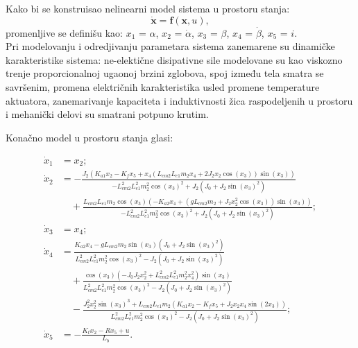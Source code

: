 \documentclass[a4paper,11pt]{article}
\theoremstyle{definition} \newtheorem{deff}{Definicija}[section]
\theoremstyle{definition} \newtheorem{prim}[deff]{Primer}
\theoremstyle{plain} \newtheorem{teor}[deff]{Teorema}
\newcommand{\vect}[1]{\boldsymbol{\mathbf{#1}}}
\begin{document}
	Kako bi se konstruisao nelinearni model sistema u prostoru stanja: 
	\begin{equation}
		\dot{ \vect{x}} = \vect{f}(\vect{x}, u),
	\end{equation}
	promenljive se definišu kao: $x_1$ = $\alpha$, $x_2$ = $\dot\alpha$,  $x_3$ = $\beta$, $x_4$ = $\dot\beta$, $x_5$ = $i$. \\
	
	
	Pri modelovanju i odredjivanju parametara sistema
	zanemarene su dinamičke karakteristike sistema: ne-elektične disipativne sile modelovane su kao viskozno trenje proporcionalnoj ugaonoj brzini zglobova, spoj između tela smatra se savršenim, promena električnih karakteristika usled promene temperature aktuatora, zanemarivanje kapaciteta i induktivnosti žica raspodeljenih u prostoru i mehanički delovi su smatrani potpuno krutim.\\
	
	
	\newpage
	
	Konačno model u prostoru stanja glasi:
	
	\begin{equation}
		\begin{aligned}
			\dot{x}_1 &= x_2; \\[0.8em]
			\dot{x}_2 &= -\frac{J_2(K_{a1}x_2 - K_fx_5 + x_4(L_{cm2}L_{e1}m_2x_4 + 2J_2x_2\cos(x_3))\sin(x_3))}{-L_{cm2}^2L_{e1}^2m_2^2\cos(x_3)^2 + J_2(J_0 + J_2\sin(x_3)^2)} \\[0.8em]
			&\quad + \frac{L_{cm2}L_{e1}m_2\cos(x_3)(-K_{a2}x_4 + (gL_{cm2}m_2 + J_2x_2^2\cos(x_3))\sin(x_3))}{-L_{cm2}^2L_{e1}^2m_2^2\cos(x_3)^2 + J_2(J_0 + J_2\sin(x_3)^2)}; \\[0.8em]
			\dot{x}_3 &= x_4; \\[0.5em]
			\dot{x}_4 &= \frac{K_{a2}x_4 - gL_{cm2}m_2\sin(x_3)(J_0 + J_2\sin(x_3)^2)}{L_{cm2}^2L_{e1}^2m_2^2\cos(x_3)^2 - J_2(J_0 + J_2\sin(x_3)^2)} \\[0.8em]
			&\quad + \frac{\cos(x_3)(-J_0J_2x_2^2 + L_{cm2}^2L_{e1}^2m_2^2x_4^2)\sin(x_3)}{L_{cm2}^2L_{e1}^2m_2^2\cos(x_3)^2 - J_2(J_0 + J_2\sin(x_3)^2)} \\[0.8em]
			&\quad - \frac{J_2^2x_2^2\sin(x_3)^3 + L_{cm2}L_{e1}m_2(K_{a1}x_2 - K_fx_5 + J_2x_2x_4\sin(2x_3))}{L_{cm2}^2L_{e1}^2m_2^2\cos(x_3)^2 - J_2(J_0 + J_2\sin(x_3)^2)};\\[0.5em]
			\dot{x}_5 &= -\frac{K_tx_2 - Rx_5 + u}{L_b}.
		\end{aligned}
		\label{eq:nonModel}
	\end{equation}\\
	
\end{document}
